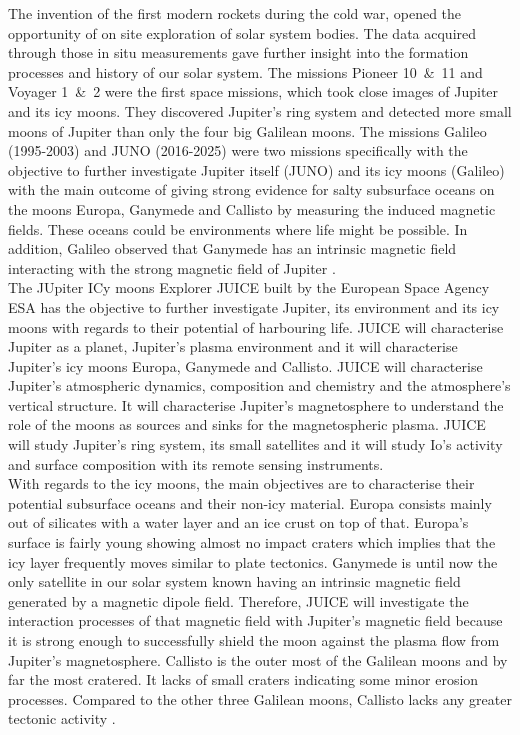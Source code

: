 	The invention of the first modern rockets during the cold war, opened the opportunity of on site exploration of solar system bodies. The data acquired through those in situ measurements gave further insight into the formation processes and history of our solar system. The missions Pioneer 10~\&~11 and Voyager 1~\&~2 were the first space missions, which took close images of Jupiter and its icy moons. They discovered Jupiter's ring system and detected more small moons of Jupiter than only the four big Galilean moons. The missions Galileo (1995-2003) and JUNO (2016-2025) were two missions specifically with the objective to further investigate Jupiter itself (JUNO) and its icy moons (Galileo) with the main outcome of giving strong evidence for salty subsurface oceans on the moons Europa, Ganymede and Callisto by measuring the induced magnetic fields. These oceans could be environments where life might be possible. In addition, Galileo observed that Ganymede has an intrinsic magnetic field interacting with the strong magnetic field of Jupiter \cite{Jupiter_SpaceMission}.\\
	The JUpiter ICy moons Explorer JUICE built by the European Space Agency ESA has the objective to further investigate Jupiter, its environment and its icy moons with regards to their potential of harbouring life. JUICE will characterise Jupiter as a planet, Jupiter's plasma environment and it will characterise Jupiter's icy moons Europa, Ganymede and Callisto. JUICE will characterise Jupiter's atmospheric dynamics, composition and chemistry and the atmosphere's vertical structure. It will characterise Jupiter's magnetosphere to understand the role of the moons as sources and sinks for the magnetospheric plasma. JUICE will study Jupiter's ring system, its small satellites and it will study Io's activity and surface composition with its remote sensing instruments.\\
	With regards to the icy moons, the main objectives are to characterise their potential subsurface oceans and their non-icy material. Europa consists mainly out of silicates with a water layer and an ice crust on top of that. Europa's surface is fairly young showing almost no impact craters which implies that the icy layer frequently moves similar to plate tectonics. Ganymede is until now the only satellite in our solar system known having an intrinsic magnetic field generated by a magnetic dipole field. Therefore, JUICE will investigate the interaction processes of that magnetic field with Jupiter's magnetic field because it is strong enough to successfully shield the moon against the plasma flow from Jupiter's magnetosphere. Callisto is the outer most of the Galilean moons and by far the most cratered. It lacks of small craters indicating some minor erosion processes. Compared to the other three Galilean moons, Callisto lacks any greater tectonic activity \cite{red_book}.\\
